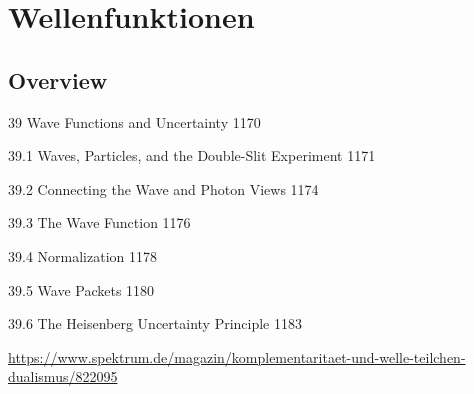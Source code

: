 \renewcommand{\lastmod}{10. September 2024}
\renewcommand{\chapterauthors}{Markus Lippitz}

\chapter{Wellenfunktionen}






\section{Overview}

39 Wave Functions and Uncertainty 1170

39.1 Waves, Particles, and the Double-Slit Experiment 1171

39.2 Connecting the Wave and Photon Views 1174

39.3 The Wave Function 1176

39.4 Normalization 1178

39.5 Wave Packets 1180

39.6 The Heisenberg Uncertainty Principle 1183


\url{https://www.spektrum.de/magazin/komplementaritaet-und-welle-teilchen-dualismus/822095}





